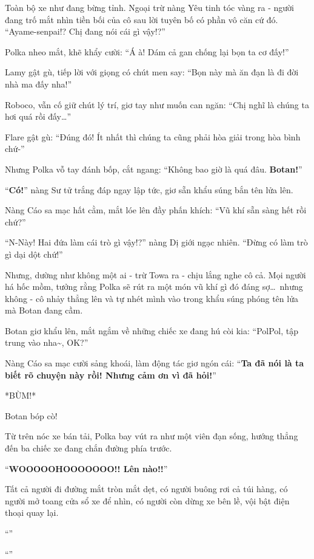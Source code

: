 \documentclass[../main.tex]{subfiles}
\begin{document}
Toàn bộ xe như đang bừng tỉnh. Ngoại trừ nàng Yêu tinh tóc vàng ra - người đang trố mắt nhìn tiền bối của cô sau lời tuyên bố có phần vô căn cứ đó. ``Ayame-senpai!? Chị đang nói cái gì vậy!?''

Polka nheo mắt, khẽ khẩy cười: ``Á à! Dám cả gan chống lại bọn ta cơ đấy!''

Lamy gật gù, tiếp lời với giọng có chút men say: ``Bọn này mà ăn đạn là đi đời nhà ma đấy nha!''

Roboco, vẫn cố giữ chút lý trí, giơ tay như muốn can ngăn: ``Chị nghĩ là chúng ta hơi quá rồi đấy\dots''

Flare gật gù: ``Đúng đó! Ít nhất thì chúng ta cũng phải hòa giải trong hòa bình chứ-''

Nhưng Polka vỗ tay đánh bốp, cắt ngang: ``Không bao giờ là quá đâu. \textbf{Botan!}''

``\textbf{Có!}'' nàng Sư tử trắng đáp ngay lập tức, giơ sẵn khẩu súng bắn tên lửa lên.

Nàng Cáo sa mạc hất cằm, mắt lóe lên đầy phấn khích: ``Vũ khí sẵn sàng hết rồi chứ?''

``N-Này! Hai đứa làm cái trò gì vậy!?'' nàng Dị giới ngạc nhiên. ``Đừng có làm trò gì dại dột chứ!''

Nhưng, dường như không một ai - trừ Towa ra - chịu lắng nghe cô cả. Mọi người há hốc mồm, tưởng rằng Polka sẽ rút ra một món vũ khí gì đó đáng sợ\dots\ nhưng không - cô nhảy thẳng lên và tự nhét mình vào trong khẩu súng phóng tên lửa mà Botan đang cầm.

Botan giơ khẩu lên, mắt ngắm về những chiếc xe đang hú còi kia: ``PolPol, tập trung vào nha\~{}, OK?''

Nàng Cáo sa mạc cười sảng khoái, làm động tác giơ ngón cái: ``\textbf{Ta đã nói là ta biết rõ chuyện này rồi! Nhưng cảm ơn vì đã hỏi!}''

*BÙM!*

Botan bóp cò!

Từ trên nóc xe bán tải, Polka bay vút ra như một viên đạn sống, hướng thẳng đến ba chiếc xe đang chắn đường phía trước.

``\textbf{WOOOOOHOOOOOOO!! Lên nào!!}''

Tất cả người đi đường mắt tròn mắt dẹt, có người buông rơi cả túi hàng, có người mở toang cửa sổ xe để nhìn, có người còn dừng xe bên lề, vội bật điện thoại quay lại.

``''

``''
\end{document}
